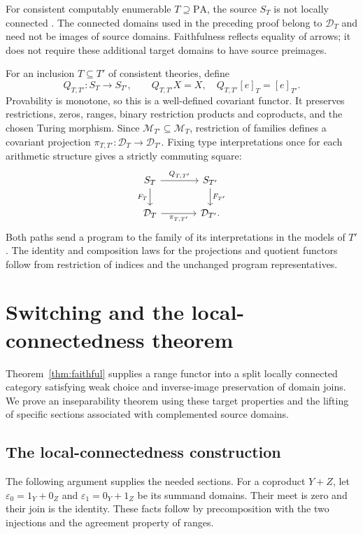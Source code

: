 \documentclass[11pt]{article}
\newcommand{\PA}{\mathrm{PA}}
\begin{document}
For consistent computably enumerable $T\supseteq\PA$, the source $S_T$
is not locally connected \cite[Corollary 4.4, pp.~657--658]{DPM}.
The connected domains used in the preceding proof belong to
$\mathcal D_T$ and need not be images of source domains. Faithfulness
reflects equality of arrows; it does not require these additional target
domains to have source preimages.

For an inclusion $T\subseteq T'$ of consistent theories, define
\[
 Q_{T,T'}:S_T\to S_{T'},\qquad
 Q_{T,T'}X=X,\quad Q_{T,T'}[e]_T=[e]_{T'}.
\]
Provability is monotone, so this is a well-defined covariant functor.
It preserves restrictions, zeros, ranges, binary restriction products
and coproducts, and the chosen Turing morphism.
Since $\mathcal M_{T'}\subseteq\mathcal M_T$, restriction of families
defines a covariant projection
$\pi_{T,T'}:\mathcal D_T\to\mathcal D_{T'}$. Fixing type interpretations
once for each arithmetic structure gives a strictly commuting square:
\[
\begin{tikzcd}[column sep=large]
 S_T \arrow[r,"Q_{T,T'}"] \arrow[d,"F_T"'] &
 S_{T'} \arrow[d,"F_{T'}"]\\
 \mathcal D_T \arrow[r,"\pi_{T,T'}"'] & \mathcal D_{T'}.
\end{tikzcd}
\]
Both paths send a program to the family of its interpretations in the
models of $T'$. The identity and composition laws for the projections
and quotient functors follow from restriction of indices and the
unchanged program representatives.

\section{Switching and the local-connectedness theorem}\label{sec:lifting}

Theorem~\ref{thm:faithful} supplies a range functor into a split locally
connected category satisfying weak choice and inverse-image preservation
of domain joins. We prove an inseparability theorem using these target
properties and the lifting of specific sections associated with
complemented source domains.

\subsection{The local-connectedness construction}

The following argument supplies the needed sections.
For a coproduct $Y+Z$, let
$\varepsilon_0=1_Y+0_Z$ and $\varepsilon_1=0_Y+1_Z$ be its summand
domains. Their meet is zero and their join is the identity. These facts
follow by precomposition with the two injections and the agreement
property of ranges.
\end{document}
